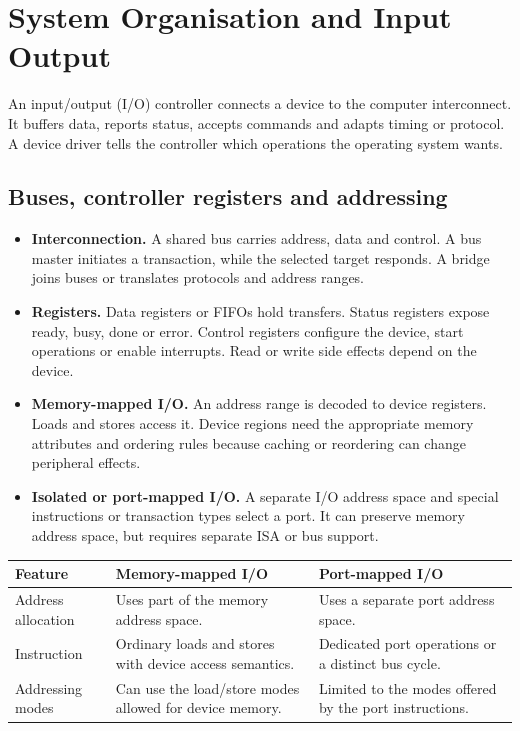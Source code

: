 \documentclass[12pt,a4paper]{article}
\begin{document}
\section{System Organisation and Input Output}
\begin{tcolorbox}[defbox,title={I/O interface and controller}]
An input/output (I/O) controller connects a device to the computer interconnect. It buffers data, reports status, accepts commands and adapts timing or protocol. A device driver tells the controller which operations the operating system wants.
\end{tcolorbox}
\subsection{Buses, controller registers and addressing}
\begin{itemize}[leftmargin=*,itemsep=3pt]
\item \textbf{Interconnection.} A shared bus carries address, data and control. A bus master initiates a transaction, while the selected target responds. A bridge joins buses or translates protocols and address ranges.
\item \textbf{Registers.} Data registers or FIFOs hold transfers. Status registers expose ready, busy, done or error. Control registers configure the device, start operations or enable interrupts. Read or write side effects depend on the device.
\item \textbf{Memory-mapped I/O.} An address range is decoded to device registers. Loads and stores access it. Device regions need the appropriate memory attributes and ordering rules because caching or reordering can change peripheral effects.
\item \textbf{Isolated or port-mapped I/O.} A separate I/O address space and special instructions or transaction types select a port. It can preserve memory address space, but requires separate ISA or bus support.
\end{itemize}
\par\vspace{6pt}\noindent
\begin{tabularx}{\linewidth}{|B{2.6cm}|Y|Y|}\hline
Feature & Memory-mapped I/O & Port-mapped I/O \\ \hline
Address allocation & Uses part of the memory address space. & Uses a separate port address space. \\ \hline
Instruction & Ordinary loads and stores with device access semantics. & Dedicated port operations or a distinct bus cycle. \\ \hline
Addressing modes & Can use the load/store modes allowed for device memory. & Limited to the modes offered by the port instructions. \\ \hline
\end{tabularx}
\end{document}
